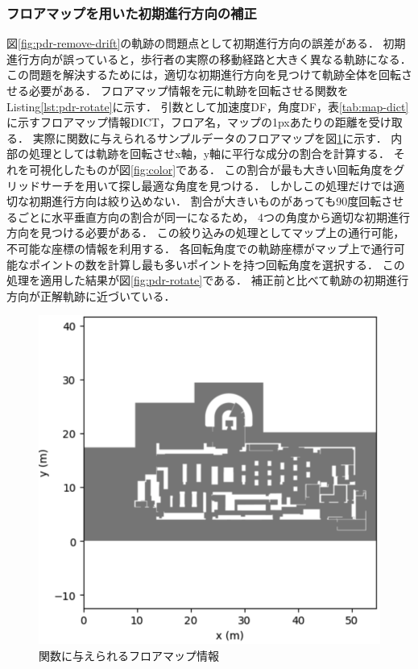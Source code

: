 


\subsubsection{フロアマップを用いた初期進行方向の補正}

図\ref{fig:pdr-remove-drift}の軌跡の問題点として初期進行方向の誤差がある．
初期進行方向が誤っていると，歩行者の実際の移動経路と大きく異なる軌跡になる．
この問題を解決するためには，適切な初期進行方向を見つけて軌跡全体を回転させる必要がある．
フロアマップ情報を元に軌跡を回転させる関数をListing\ref{lst:pdr-rotate}に示す．
引数として加速度DF，角度DF，表\ref{tab:map-dict}に示すフロアマップ情報DICT，フロア名，マップの1pxあたりの距離を受け取る．
実際に関数に与えられるサンプルデータのフロアマップを図\ref{fig:floor-map}に示す．
内部の処理としては軌跡を回転させx軸，y軸に平行な成分の割合を計算する．
それを可視化したものが図\ref{fig:color}である．
この割合が最も大きい回転角度をグリッドサーチを用いて探し最適な角度を見つける．
しかしこの処理だけでは適切な初期進行方向は絞り込めない．
割合が大きいものがあっても90度回転させるごとに水平垂直方向の割合が同一になるため，
4つの角度から適切な初期進行方向を見つける必要がある．
この絞り込みの処理としてマップ上の通行可能，不可能な座標の情報を利用する．
各回転角度での軌跡座標がマップ上で通行可能なポイントの数を計算し最も多いポイントを持つ回転角度を選択する．
この処理を適用した結果が図\ref{fig:pdr-rotate}である．
補正前と比べて軌跡の初期進行方向が正解軌跡に近づいている．


\begin{figure}[ht]
	\centering
	\includegraphics[width=\linewidth]{image/floor-map.jpg}
  \caption{関数に与えられるフロアマップ情報} \label{fig:floor-map}
\end{figure}

